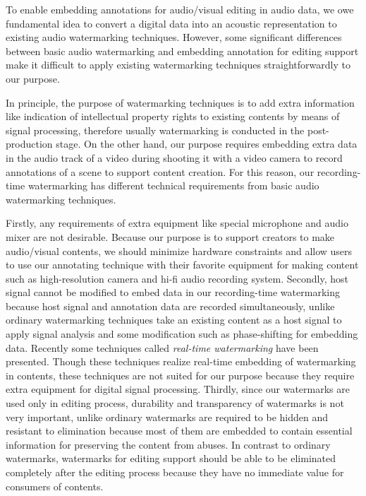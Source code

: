 
To enable embedding annotations for audio/visual editing in audio data, we owe fundamental idea to convert a digital data into an acoustic representation to existing audio watermarking techniques.
However, some significant differences between basic audio watermarking and embedding annotation for editing support make it difficult to apply existing watermarking techniques straightforwardly to our purpose.

In principle, the purpose of watermarking techniques is to add extra information like indication of intellectual property rights to existing contents by means of signal processing, therefore usually watermarking is conducted in the post-production stage.
On the other hand, our purpose requires embedding extra data in the audio track of a video during shooting it with a video camera to record annotations of a scene to support content creation.
For this reason, our recording-time watermarking has different technical requirements from basic audio watermarking techniques.

Firstly, any requirements of extra equipment like special microphone and audio mixer are not desirable.
Because our purpose is to support creators to make audio/visual contents, we should minimize hardware constraints and allow users to use our annotating technique with their favorite equipment for making content such as high-resolution camera and hi-fi audio recording system.
Secondly, host signal cannot be modified to embed data in our recording-time watermarking because host signal and annotation data are recorded simultaneously, unlike ordinary watermarking techniques take an existing content as a host signal to apply signal analysis and some modification such as phase-shifting for embedding data. %
Recently some techniques called {\it real-time watermarking} have been presented. Though these techniques realize real-time embedding of watermarking in contents, these techniques are not suited for our purpose because they require extra equipment for digital signal processing.
Thirdly, since our watermarks are used only in editing process, durability and transparency of watermarks is not very important, unlike ordinary watermarks are required to be hidden and resistant to elimination because most of them are embedded to contain essential information for preserving the content from abuses.
In contrast to ordinary watermarks, watermarks for editing support should be able to be eliminated completely after the editing process because they have no immediate value for consumers of contents.

